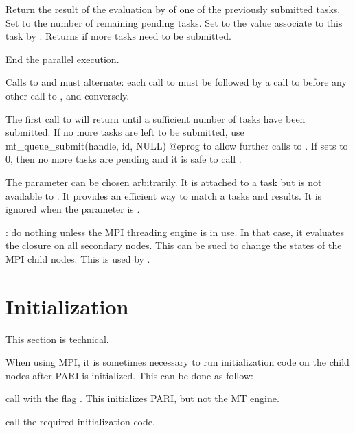 Return the result of the evaluation by  of one of the previously
submitted tasks. Set  to the number of remaining pending tasks.
Set  to the value associate to this task by
.  Returns  if more tasks need to be
submitted.

 End the parallel execution.

Calls to  and  must alternate: each
call to  must be followed by a call to
 before any other call to ,
and conversely.

The first call to  will return  until a
sufficient number of tasks have been submitted. If no more tasks are left
to be submitted, use
\bprog
  mt_queue_submit(handle, id, NULL)
@eprog\noindent
to allow further calls to .  If  sets
 to $0$, then no more tasks are pending and it is safe to call
.

The parameter  can be chosen arbitrarily. It is attached to a
task but is not available to .  It provides an efficient way to
match a tasks and results. It is ignored when the parameter  is
.


: do nothing unless the MPI threading engine
is in use. In that case, it evaluates the closure   on all secondary
nodes. This can be sued to change the states of the MPI child nodes.
This is used by .

\section{Initialization}

This section is technical.

 \label{pari_mt_init}
When using MPI, it is sometimes necessary to run initialization code on the
child nodes after PARI is initialized. This can be done as follow:

\item call  with the flag .
This initializes PARI, but not the MT engine.

\item call the required initialization code.

